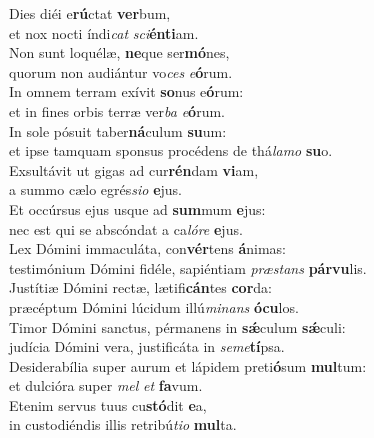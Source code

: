 \evenverse Dies diéi e\textbf{rú}ctat \textbf{ver}bum,~\*\\
\evenverse et nox nocti índi\textit{cat} \textit{sci}\textbf{én}\textbf{ti}am.\\
\oddverse Non sunt loquélæ, \textbf{ne}que ser\textbf{mó}nes,~\*\\
\oddverse quorum non audiántur vo\textit{ces} \textit{e}\textbf{ó}rum.\\
\evenverse In omnem terram exívit \textbf{so}nus e\textbf{ó}rum:~\*\\
\evenverse et in fines orbis terræ ver\textit{ba} \textit{e}\textbf{ó}rum.\\
\oddverse In sole pósuit taber\textbf{ná}culum \textbf{su}um:~\*\\
\oddverse et ipse tamquam sponsus procédens de thá\textit{la}\textit{mo} \textbf{su}o.\\
\evenverse Exsultávit ut gigas ad cur\textbf{rén}dam \textbf{vi}am,~\*\\
\evenverse a summo cælo egrés\textit{si}\textit{o} \textbf{e}jus.\\
\oddverse Et occúrsus ejus usque ad \textbf{sum}mum \textbf{e}jus:~\*\\
\oddverse nec est qui se abscóndat a ca\textit{ló}\textit{re} \textbf{e}jus.\\
\evenverse Lex Dómini immaculáta, con\textbf{vér}tens \textbf{á}nimas:~\*\\
\evenverse testimónium Dómini fidéle, sapiéntiam \textit{præ}\textit{stans} \textbf{pár}\textbf{vu}lis.\\
\oddverse Justítiæ Dómini rectæ, lætifi\textbf{cán}tes \textbf{cor}da:~\*\\
\oddverse præcéptum Dómini lúcidum illú\textit{mi}\textit{nans} \textbf{ó}\textbf{cu}los.\\
\evenverse Timor Dómini sanctus, pérmanens in \textbf{sǽ}culum \textbf{sǽ}culi:~\*\\
\evenverse judícia Dómini vera, justificáta in \textit{se}\textit{me}\textbf{tí}psa.\\
\oddverse Desiderabília super aurum et lápidem preti\textbf{ó}sum \textbf{mul}tum:~\*\\
\oddverse et dulcióra super \textit{mel} \textit{et} \textbf{fa}vum.\\
\evenverse Etenim servus tuus cu\textbf{stó}dit \textbf{e}a,~\*\\
\evenverse in custodiéndis illis retribú\textit{ti}\textit{o} \textbf{mul}ta.\\
